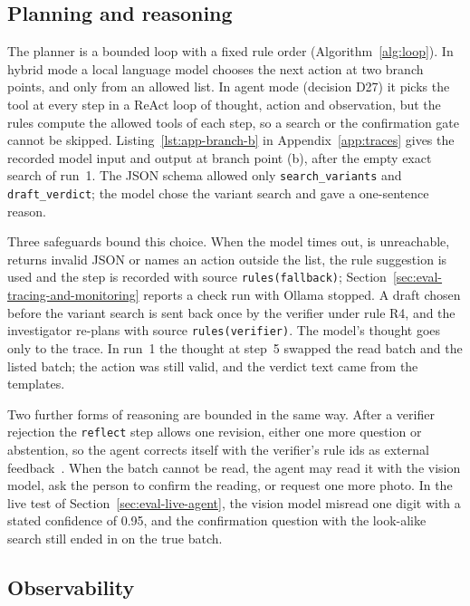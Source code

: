 \subsection{Planning and reasoning}
\label{sec:concepts-planning}

The planner is a bounded loop with a fixed rule order (Algorithm~\ref{alg:loop}). In hybrid mode a local language model chooses the next action at two branch points, and only from an allowed list. In agent mode (decision D27) it picks the tool at every step in a ReAct loop of thought, action and observation, but the rules compute the allowed tools of each step, so a search or the confirmation gate cannot be skipped. Listing~\ref{lst:app-branch-b} in Appendix~\ref{app:traces} gives the recorded model input and output at branch point (b), after the empty exact search of run~1. The JSON schema allowed only \texttt{search\_variants} and \texttt{draft\_verdict}; the model chose the variant search and gave a one-sentence reason.


Three safeguards bound this choice. When the model times out, is unreachable, returns invalid JSON or names an action outside the list, the rule suggestion is used and the step is recorded with source \texttt{rules(fallback)}; Section~\ref{sec:eval-tracing-and-monitoring} reports a check run with Ollama stopped. A draft chosen before the variant search is sent back once by the verifier under rule R4, and the investigator re-plans with source \texttt{rules(verifier)}. The model's thought goes only to the trace. In run~1 the thought at step~5 swapped the read batch and the listed batch; the action was still valid, and the verdict text came from the templates.

Two further forms of reasoning are bounded in the same way. After a verifier rejection the \texttt{reflect} step allows one revision, either one more question or abstention, so the agent corrects itself with the verifier's rule ids as external feedback~\cite{huang2024cannot}. When the batch cannot be read, the agent may read it with the vision model, ask the person to confirm the reading, or request one more photo. In the live test of Section~\ref{sec:eval-live-agent}, the vision model misread one digit with a stated confidence of 0.95, and the confirmation question with the look-alike search still ended in \FLAGGED{} on the true batch.

\subsection{Observability}
\label{sec:concepts-observability}

